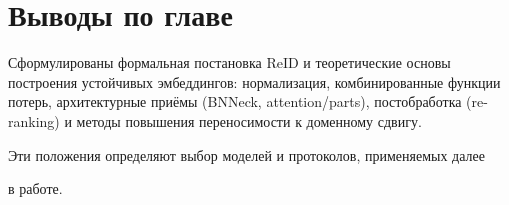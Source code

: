 \section{Выводы по главе}
Сформулированы формальная постановка ReID и теоретические основы построения устойчивых эмбеддингов: нормализация, комбинированные функции потерь, архитектурные приёмы (BNNeck, attention/parts), постобработка (re-ranking) и методы повышения переносимости к доменному сдвигу. 

Эти положения определяют выбор моделей и протоколов, применяемых далее 

в работе.


